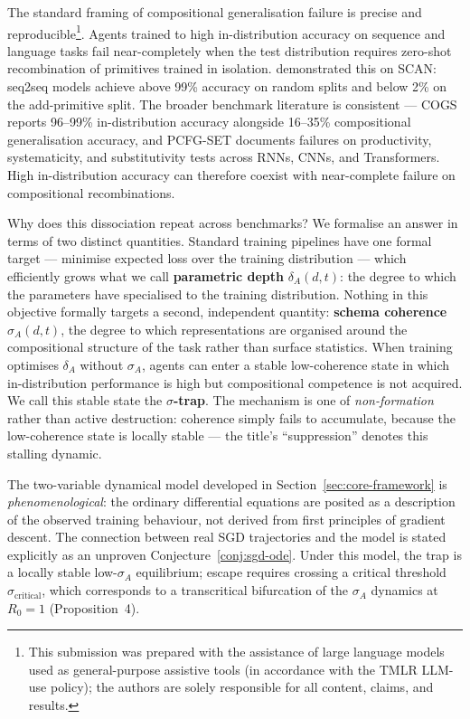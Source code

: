 \documentclass{article}
\theoremstyle{definition}
\begin{document}
The standard framing of compositional generalisation failure is
precise and reproducible\footnote{This submission was prepared with the
assistance of large language models used as general-purpose assistive
tools (in accordance with the TMLR LLM-use policy); the authors are
solely responsible for all content, claims, and results.}.
Agents trained to high in-distribution
accuracy on sequence and language tasks fail near-completely when the
test distribution requires zero-shot recombination of primitives
trained in isolation. \cite{lake2018generalizationwithoutsystematicity}
demonstrated this on SCAN: seq2seq models achieve above 99\% accuracy
on random splits and below 2\% on the add-primitive split. The broader
benchmark literature is consistent --- COGS
\citep{kim2020cogscompositionalgeneralizationchallenge} reports
96--99\% in-distribution accuracy alongside 16--35\% compositional
generalisation accuracy, and PCFG-SET
\citep{hupkes2020compositionalitydecomposed} documents failures on
productivity, systematicity, and substitutivity tests across RNNs,
CNNs, and Transformers. High in-distribution accuracy can therefore
coexist with near-complete failure on compositional recombinations.

Why does this dissociation repeat across benchmarks? We formalise an
answer in terms of two distinct quantities. Standard training
pipelines have one formal target --- minimise expected loss over the
training distribution --- which efficiently grows what we call
\textbf{parametric depth} $\delta_A(d,t)$: the degree to which the
parameters have specialised to the training distribution. Nothing in
this objective formally targets a second, independent quantity:
\textbf{schema coherence} $\sigma_A(d,t)$, the degree to which
representations are organised around the compositional structure of
the task rather than surface statistics. When training optimises
$\delta_A$ without $\sigma_A$, agents can enter a stable low-coherence
state in which in-distribution performance is high but compositional
competence is not acquired. We call this stable state the
\textbf{$\sigma$-trap}. The mechanism is one of \emph{non-formation}
rather than active destruction: coherence simply fails to accumulate,
because the low-coherence state is locally stable --- the title's
``suppression'' denotes this stalling dynamic.

The two-variable dynamical model developed in Section~\ref{sec:core-framework}
is \emph{phenomenological}: the ordinary differential equations are
posited as a description of the observed training behaviour, not
derived from first principles of gradient descent. The connection
between real SGD trajectories and the model is stated explicitly as an
unproven Conjecture~\ref{conj:sgd-ode}. Under this model, the trap is a
locally stable low-$\sigma_A$ equilibrium; escape requires crossing a
critical threshold $\sigma_{\text{critical}}$, which corresponds to a
transcritical bifurcation of the $\sigma_A$ dynamics at $R_0 = 1$
(Proposition~4).
\end{document}

